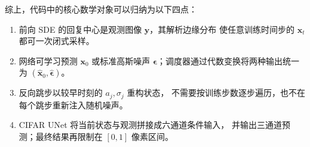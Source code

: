 \documentclass[UTF8,a4paper,12pt]{ctexart}
\begin{document}
综上，代码中的核心数学对象可以归纳为以下四点：
\begin{enumerate}[label=\arabic*.]
  \item 前向 SDE 的回复中心是观测图像 \(\bm{y}\)，其解析边缘分布
  使任意训练时间步的 \(\bm{x}_t\) 都可一次闭式采样。
  \item 网络可学习预测 \(\bm{x}_0\) 或标准高斯噪声
  \(\bm{\epsilon}\)；调度器通过代数变换将两种输出统一为
  \((\widehat{\bm{x}}_0,\widehat{\bm{\epsilon}})\)。
  \item 反向跳步以较早时刻的 \(a_j,\sigma_j\) 重构状态，
  不需要按训练步数逐步遍历，也不在每个跳步重新注入随机噪声。
  \item CIFAR UNet 将当前状态与观测拼接成六通道条件输入，
  并输出三通道预测；最终结果再限制在 \([0,1]\) 像素区间。
\end{enumerate}
\end{document}
